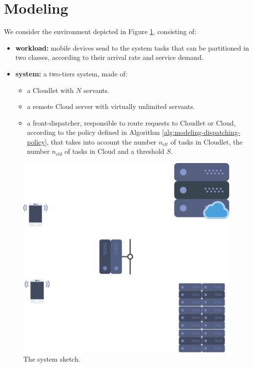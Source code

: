 \section{Modeling}
\label{sec:modeling}


We consider the environment depicted in Figure \ref{fig:modeling-system-sketch}, consisting of:

\begin{itemize}
	\item  \textbf{workload:} mobile devices send to the system tasks that can be partitioned in two classes, according to their arrival rate and service demand.
	\item \textbf{system:} a two-tiers system, made of:	
	\begin{itemize}
		\item a Cloudlet with $N$ servants.
		\item a remote Cloud server with virtually unlimited servants.
		\item a front-dispatcher, responsible to route requests to Cloudlet or Cloud, according to the policy defined in Algorithm \ref{alg:modeling-dispatching-policy}, that takes into account the number $n_{clt}$ of tasks in Cloudlet, the number $n_{cld}$ of tasks in Cloud and a threshold $S$.
	\end{itemize}
\end{itemize}

\begin{figure}
	\label{fig:modeling-system-sketch}
	\includegraphics[width=\columnwidth]{fig/modeling-system-sketch}
	\caption{The system sketch.}
\end{figure}

